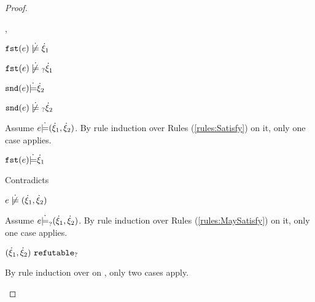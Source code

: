 \begin{proof}
\begin{byCases}
\begin{byCases}
\begin{byCases}
        \item[\cnotsatisfyormay{\hfst{e}}{\hxi_1},\csatisfy{\hsnd{e}}{\hxi_2}]
            \begin{pfsteps*}
            \item $\cnotsatisfy{\hfst{e}}{\hxi_1}$  
            \item $\cnotmaysatisfy{\hfst{e}}{\hxi_1}$  
            \item $\mathtt{snd}(e) \dot{\models} \dot{\xi}_2$  
            \item $\cnotmaysatisfy{\hsnd{e}}{\hxi_2}$  
            \end{pfsteps*}
            Assume $e \dot{\models} (\dot{\xi}_1 , \dot{\xi}_2)$. By rule induction over Rules (\ref{rules:Satisfy}) on it, only one case applies.
            \begin{byCases}
            \item[\text{(\ref{rule:CSNotIntroPair})}]
                \begin{pfsteps*}
                \item $\mathtt{fst}(e) \dot{\models} \dot{\xi}_1$ 
                \end{pfsteps*}
                Contradicts 
            \end{byCases}
            \begin{pfsteps*}
            \item $\cnotsatisfy{e}{\cpair{\hxi_1}{\hxi_2}}$  
            \end{pfsteps*}
            Assume $e \dot{\models}_{?} (\dot{\xi}_1 , \dot{\xi}_2)$. By rule induction over Rules (\ref{rules:MaySatisfy}) on it, only one case applies.
            \begin{byCases}
            \item[\text{(\ref{rule:CMSNotIntro})}]
                \begin{pfsteps*}
                \item $(\dot{\xi}_1 , \dot{\xi}_2) ~\mathtt{refutable}_?$  
                \end{pfsteps*}
                By rule induction over  on , only two cases apply.
                \begin{byCases}
                \item[\text{(\ref{rule:RXPairL})}]

\end{byCases}
\end{byCases}
\end{byCases}
\end{byCases}
\end{byCases}
\end{proof}
